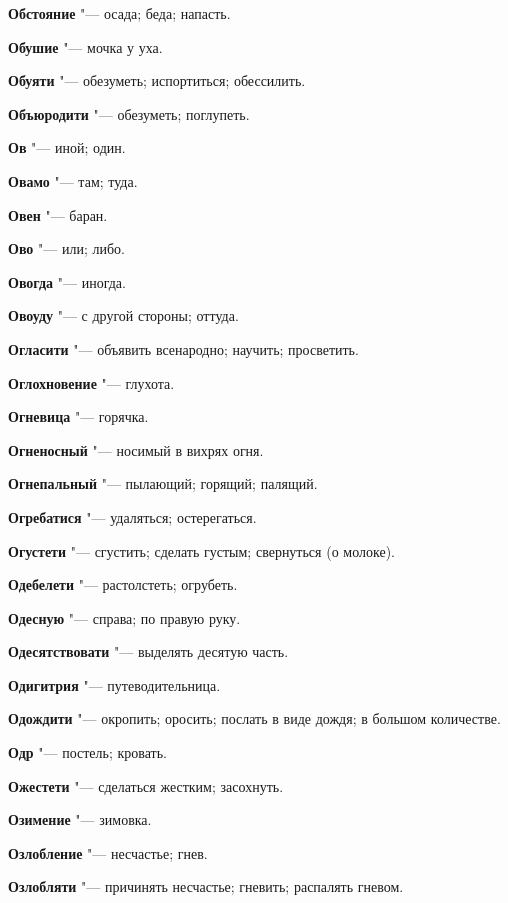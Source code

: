 \begin{mymulticols}
\noindent\textbf{Обстояние} "--- осада; беда; напасть. 

\noindent\textbf{Обушие} "--- мочка у уха. 

\noindent\textbf{Обуяти} "--- обезуметь; испортиться; обессилить. 

\noindent\textbf{Объюродити} "--- обезуметь; поглупеть. 

\noindent\textbf{Ов} "--- иной; один. 

\noindent\textbf{Овамо} "--- там; туда. 

\noindent\textbf{Овен} "--- баран. 

\noindent\textbf{Ово} "--- или; либо. 

\noindent\textbf{Овогда} "--- иногда. 

\noindent\textbf{Овоуду} "--- с другой стороны; оттуда. 

\noindent\textbf{Огласити} "--- объявить всенародно; научить; просветить. 

\noindent\textbf{Оглохновение} "--- глухота. 

\noindent\textbf{Огневица} "--- горячка. 

\noindent\textbf{Огненосный} "--- носимый в вихрях огня. 

\noindent\textbf{Огнепальный} "--- пылающий; горящий; палящий. 

\noindent\textbf{Огребатися} "--- удаляться; остерегаться. 

\noindent\textbf{Огустети} "--- сгустить; сделать густым; свернуться (о молоке). 

\noindent\textbf{Одебелети} "--- растолстеть; огрубеть. 

\noindent\textbf{Одесную} "--- справа; по правую руку. 

\noindent\textbf{Одесятствовати} "--- выделять десятую часть. 

\noindent\textbf{Одигитрия} "--- путеводительница. 

\noindent\textbf{Одождити} "--- окропить; оросить; послать в виде дождя; в большом количестве. 

\noindent\textbf{Одр} "--- постель; кровать. 

\noindent\textbf{Ожестети} "--- сделаться жестким; засохнуть. 

\noindent\textbf{Озимение} "--- зимовка. 

\noindent\textbf{Озлобление} "--- несчастье; гнев. 

\noindent\textbf{Озлобляти} "--- причинять несчастье; гневить; распалять гневом. 


\end{mymulticols}
